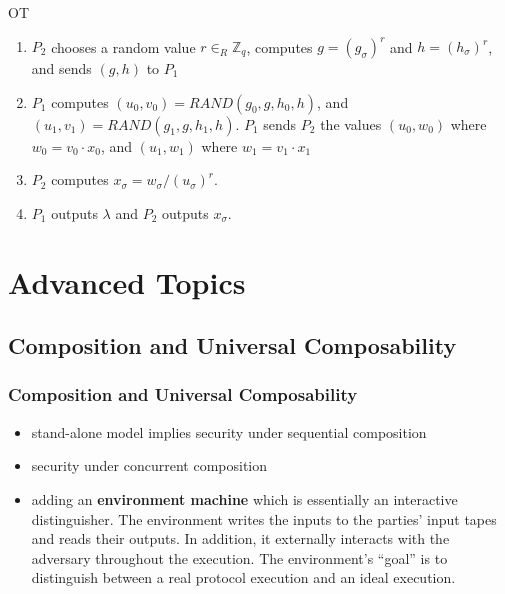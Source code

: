 \documentclass{beamer}
\begin{document}
    \begin{frame}
        \frametitle{}
        \begin{block}{OT}
            \begin{enumerate}
                \item $P_{2}$ chooses a random value $r \in_{R} \mathbb{Z}_{q}$, computes $g=\left(g_{\sigma}\right)^{r}$ and $h=\left(h_{\sigma}\right)^{r}$, and sends $(g, h)$ to $P_{1}$
                \item $P_{1}$ computes $\left(u_{0}, v_{0}\right)=R A N D\left(g_{0}, g, h_{0}, h\right)$, and $\left(u_{1}, v_{1}\right)=R A N D\left(g_{1}, g, h_{1}, h\right)$.
                $P_{1}$ sends $P_{2}$ the values $\left(u_{0}, w_{0}\right)$ where $w_{0}=v_{0} \cdot x_{0}$, and $\left(u_{1}, w_{1}\right)$ where $w_{1}=v_{1} \cdot x_{1}$
                \item $P_{2}$ computes $x_{\sigma}=w_{\sigma} /\left(u_{\sigma}\right)^{r} .$
                \item $P_{1}$ outputs $\lambda$ and $P_{2}$ outputs $x_{\sigma}$.
            \end{enumerate}
        \end{block}
    
        
    
    \end{frame}
    \section{Advanced Topics}
    \sectionpage
    \subsection{Composition and Universal Composability}
    \subsectionpage
    \begin{frame}
        \frametitle{Composition and Universal Composability}
        \begin{itemize}
            \item stand-alone model implies security under sequential composition
            \item security under concurrent composition
            \item adding an \textbf{environment machine} which is essentially an interactive distinguisher. The environment writes the inputs to the parties’ input tapes and reads their outputs. In addition, it externally interacts with the adversary throughout the execution. The environment’s “goal” is to distinguish between a real protocol execution and an ideal execution.
        \end{itemize}
        
    
    \end{frame}
\end{document}
